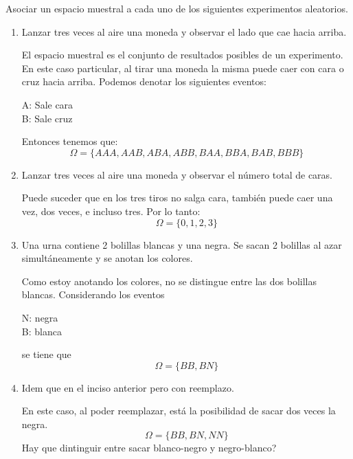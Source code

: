 \item Asociar un espacio muestral a cada uno de los siguientes experimentos aleatorios.
    \begin{enumerate}
        \item Lanzar tres veces al aire una moneda y observar el lado que cae hacia arriba.
            \begin{mdframed}[style=s]
                El espacio muestral es el conjunto de resultados posibles de un experimento. En este caso particular, al tirar una moneda la misma puede caer con cara o cruz hacia arriba. Podemos denotar los siguientes eventos:
                \begin{center}
                    A: Sale cara\\
                    B: Sale cruz
                \end{center}
                Entonces tenemos que:\[\Omega=\{AAA,AAB,ABA,ABB,BAA,BBA,BAB,BBB\}\]
            \end{mdframed}
        \item Lanzar tres veces al aire una moneda y observar el número total de caras.
            \begin{mdframed}[style=s]
                Puede suceder que en los tres tiros no salga cara, también puede caer una vez, dos veces, e incluso tres. Por lo tanto:\[\Omega=\{0,1,2,3\}\]
            \end{mdframed}
        \item Una urna contiene 2 bolillas blancas y una negra. Se sacan 2 bolillas al azar simultáneamente y se anotan los colores.
            \begin{mdframed}[style=s]
                Como estoy anotando los colores, no se distingue entre las dos bolillas blancas. Considerando los eventos
                \begin{center}
                    N: negra\\
                    B: blanca
                \end{center}
                se tiene que\[\Omega=\{BB,BN\}\]
            \end{mdframed}
        \item Idem que en el inciso anterior pero con reemplazo.
            \begin{mdframed}[style=s]
                En este caso, al poder reemplazar, está la posibilidad de sacar dos veces la negra.\[\Omega=\{BB,BN,NN\}\]
                Hay que dintinguir entre sacar blanco-negro y negro-blanco?
            \end{mdframed}

\end{enumerate}

